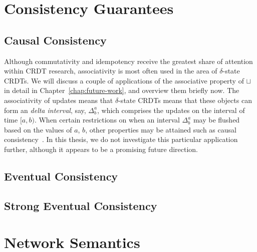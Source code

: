 \section{Consistency Guarantees}
\subsection{Causal Consistency}
Although commutativity and idempotency receive the greatest share of attention
within CRDT research, associativity is most often used in the area of
$\delta$-state CRDTs. We will discuss a couple of applications of the
associative property of $\sqcup$ in detail in Chapter~\ref{chap:future-work},
and overview them briefly now. The associativity of updates means that
$\delta$-state CRDTs means that these objects can form an \emph{delta interval},
say, $\Delta^a_b$, which comprises the updates on the interval of time $[a,b)$.
When certain restrictions on when an interval $\Delta^a_b$ may be flushed based
on the values of $a$, $b$, other properties may be attained such as causal
consistency~\citep{almedia18}. In this thesis, we do not investigate this
particular application further, although it appears to be a promising future
direction.

\subsection{Eventual Consistency}
\subsection{Strong Eventual Consistency}
\section{Network Semantics}

